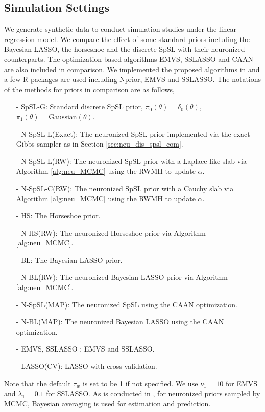 \subsection{Simulation Settings}

We generate synthetic data to conduct simulation studies under the linear regression model. We compare the effect of some standard priors including the Bayesian LASSO, the horseshoe and the discrete SpSL with their neuronized counterparts. The optimization-based algorithms EMVS, SSLASSO and CAAN are also included in comparison. We implemented the proposed algorithms in \citet{shin2021neuronized} and a few R packages are used including Nprior, EMVS and SSLASSO. The notations of the methods for priors in comparison are as follows,
\begin{itemize}[itemsep=0pt]
    \item[-] SpSL-G: Standard discrete SpSL prior, $\pi_0(\theta) = \delta_0(\theta)$, $\pi_1(\theta) = \text{Gaussian}(\theta)$.
    \item[-] N-SpSL-L(Exact): The neuronized SpSL prior implemented via the exact Gibbs sampler as in Section \ref{sec:neu_dis_spsl_com}.
    \item[-] N-SpSL-L(RW): The neuronized SpSL prior with a Laplace-like slab via Algorithm \ref{alg:neu_MCMC} using the RWMH to update $\alpha$.
    \item[-] N-SpSL-C(RW): The neuronized SpSL prior with a Cauchy slab via Algorithm \ref{alg:neu_MCMC} using the RWMH to update $\alpha$.
    \item[-] HS: The Horseshoe prior.
    \item[-] N-HS(RW): The neuronized Horseshoe prior via Algorithm \ref{alg:neu_MCMC}.
    \item[-] BL: The Bayesian LASSO prior.
    \item[-] N-BL(RW): The neuronized Bayesian LASSO prior via Algorithm \ref{alg:neu_MCMC}.
    \item[-] N-SpSL(MAP): The neuronized SpSL using the CAAN optimization.
    \item[-] N-BL(MAP): The neuronized Bayesian LASSO using the CAAN optimization.
    \item[-] EMVS, SSLASSO : EMVS and SSLASSO.
    \item[-] LASSO(CV): LASSO with cross validation.
\end{itemize}


Note that the default $\tau_w$ is set to be 1 if not specified. We use $\nu_1 = 10$ for EMVS and $\lambda_1 = 0.1$ for SSLASSO.
As is conducted in \citet{shin2021neuronized}, for neuronized priors sampled by MCMC, Bayesian averaging is used for estimation and prediction. 

